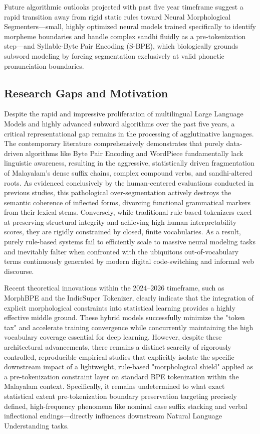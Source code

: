 \documentclass[12pt]{article}
\begin{document}
Future algorithmic outlooks projected with past five year timeframe suggest a rapid transition away from rigid static rules toward Neural Morphological Segmenters—small, highly optimized neural models trained specifically to identify morpheme boundaries and handle complex sandhi fluidly as a pre-tokenization step—and Syllable-Byte Pair Encoding (S-BPE), which biologically grounds subword modeling by forcing segmentation exclusively at valid phonetic pronunciation boundaries. 

\subsection{Research Gaps and Motivation }

Despite the rapid and impressive proliferation of multilingual Large Language Models and highly advanced subword algorithms over the past five years, a critical representational gap remains in the processing of agglutinative languages. The contemporary literature comprehensively demonstrates that purely data-driven algorithms like Byte Pair Encoding and WordPiece fundamentally lack linguistic awareness, resulting in the aggressive, statistically driven fragmentation of Malayalam’s dense suffix chains, complex compound verbs, and sandhi-altered roots. As evidenced conclusively by the human-centered evaluations conducted in previous studies, this pathological over-segmentation actively destroys the semantic coherence of inflected forms, divorcing functional grammatical markers from their lexical stems. Conversely, while traditional rule-based tokenizers excel at preserving structural integrity and achieving high human interpretability scores, they are rigidly constrained by closed, finite vocabularies. As a result, purely rule-based systems fail to efficiently scale to massive neural modeling tasks and inevitably falter when confronted with the ubiquitous out-of-vocabulary terms continuously generated by modern digital code-switching and informal web discourse.

Recent theoretical innovations within the 2024–2026 timeframe, such as MorphBPE and the IndicSuper Tokenizer, clearly indicate that the integration of explicit morphological constraints into statistical learning provides a highly effective middle ground. These hybrid models successfully minimize the "token tax" and accelerate training convergence while concurrently maintaining the high vocabulary coverage essential for deep learning. However, despite these architectural advancements, there remains a distinct scarcity of rigorously controlled, reproducible empirical studies that explicitly isolate the specific downstream impact of a lightweight, rule-based "morphological shield" applied as a pre-tokenization constraint layer on standard BPE tokenization within the Malayalam context. Specifically, it remains undetermined to what exact statistical extent pre-tokenization boundary preservation targeting precisely defined, high-frequency phenomena like nominal case suffix stacking and verbal inflectional endings—directly influences downstream Natural Language Understanding tasks. 
\end{document}

